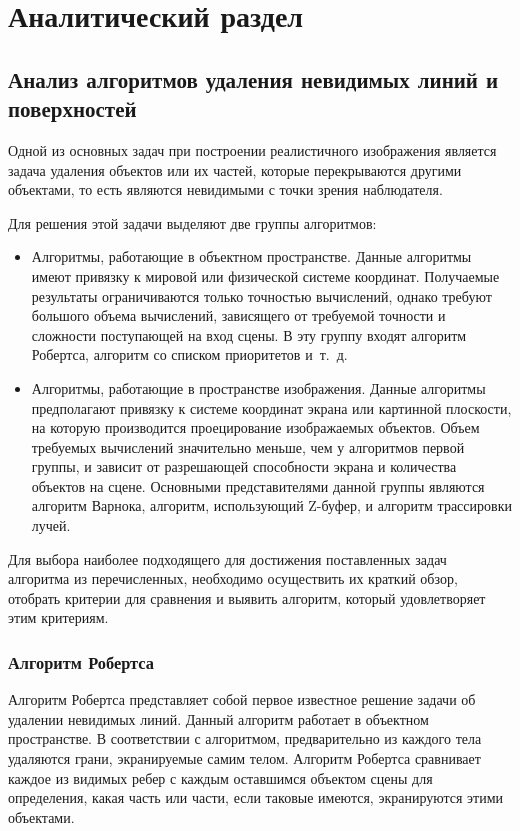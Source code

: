 \chapter{Аналитический раздел}

\section{Анализ алгоритмов удаления невидимых линий и поверхностей}

Одной из основных задач при построении реалистичного изображения является задача удаления объектов или их частей, которые перекрываются другими объектами, то есть являются невидимыми с точки зрения наблюдателя.

Для решения этой задачи выделяют две группы алгоритмов:
\begin{itemize}
	\item Алгоритмы, работающие в объектном пространстве.
	Данные алгоритмы имеют привязку к мировой или физической системе координат.
	Получаемые результаты ограничиваются только точностью вычислений, однако требуют большого объема вычислений, зависящего от требуемой точности и сложности поступающей на вход сцены.
	В эту группу входят алгоритм Робертса, алгоритм со списком приоритетов и~т.~д.

	\item Алгоритмы, работающие в пространстве изображения.
	Данные алгоритмы предполагают привязку к системе координат экрана или картинной плоскости, на которую производится проецирование изображаемых объектов.
	Объем требуемых вычислений значительно меньше, чем у алгоритмов первой группы, и зависит от разрешающей способности экрана и количества объектов на сцене.
	Основными представителями данной группы являются алгоритм Варнока, алгоритм, использующий Z-буфер, и алгоритм трассировки лучей. \cite{Rogers}
\end{itemize}

Для выбора наиболее подходящего для достижения поставленных задач алгоритма из перечисленных, необходимо осуществить их краткий обзор, отобрать критерии для сравнения и выявить алгоритм, который удовлетворяет этим критериям.

\subsection{Алгоритм Робертса}

Алгоритм Робертса представляет собой первое известное решение задачи об удалении невидимых линий.
Данный алгоритм работает в объектном пространстве.
В соответствии с алгоритмом, предварительно из каждого тела удаляются грани, экранируемые самим телом.
Алгоритм Робертса сравнивает каждое из видимых ребер с каждым оставшимся объектом сцены для определения, какая часть или части, если таковые имеются, экранируются этими объектами.

